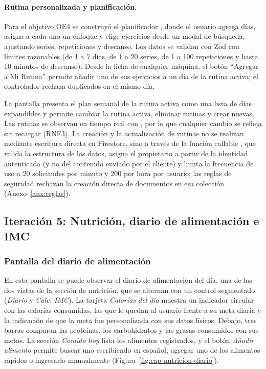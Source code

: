 \paragraph{Rutina personalizada y planificación.} Para el objetivo OE4 se
construyó el planificador , donde el usuario
agrega días, asigna a cada uno un enfoque y elige ejercicios desde un modal
de búsqueda, ajustando series, repeticiones y descanso. Los datos se validan
con Zod con límites razonables (de 1 a 7 días, de 1 a 20 series, de 1 a 100
repeticiones y hasta 10 minutos de descanso). Desde la ficha de cualquier
máquina, el botón ``Agregar a Mi Rutina'' permite añadir uno de sus
ejercicios a un día de la rutina activa; el controlador rechaza duplicados en
el mismo día.

La pantalla  presenta el plan semanal de la rutina
activa como una lista de días expandibles y permite cambiar la rutina activa,
eliminar rutinas y crear nuevas. Las rutinas se observan en tiempo real con
, por lo que cualquier cambio se refleja sin recargar
(RNF3). La creación y la actualización de rutinas no se realizan mediante
escritura directa en Firestore, sino a través de la función callable
, que valida la estructura de los datos, asigna el
propietario a partir de la identidad autenticada (y no del contenido enviado
por el cliente) y limita la frecuencia de uso a 20 solicitudes por minuto y 200
por hora por usuario; las reglas de seguridad rechazan la creación directa de
documentos en esa colección (Anexo~\ref{anx:reglas}).

\subsection{Iteración 5: Nutrición, diario de alimentación e IMC}
\label{subsec:it5}

\subsubsection{Pantalla del diario de alimentación}

En esta pantalla se puede observar el diario de alimentación del día, una de
las dos vistas de la sección de nutrición, que se alternan con un control
segmentado (\emph{Diario} y \emph{Calc. IMC}). La tarjeta \emph{Calorías del
día} muestra un indicador circular con las calorías consumidas, las que le
quedan al usuario frente a su meta diaria y la indicación de que la meta fue
personalizada con sus datos físicos. Debajo, tres barras comparan las
proteínas, los carbohidratos y las grasas consumidos con sus metas. La sección
\emph{Comido hoy} lista los alimentos registrados, y el botón
\emph{Añadir alimento} permite buscar uno escribiendo en español, agregar uno
de los alimentos rápidos o ingresarlo manualmente (Figura~\ref{fig:cap-nutricion-diario}).


